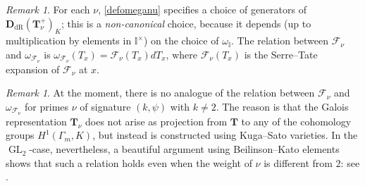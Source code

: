 \documentclass[a4paper,11pt]{amsart}
\numberwithin{equation}{section}
\theoremstyle{plain}
\theoremstyle{definition}
\theoremstyle{remark}
\newtheorem{remark}[theorem]{Remark}
\newcommand{\I}{\mathbb{I}}
\DeclareMathOperator{\GL}{GL}
\begin{document}
\begin{remark} For each $\nu$, \eqref{defomeganu} specifies a choice of generators of 
$\mathbf{D}_\mathrm{dR}(\mathbf{T}_\nu^+)_K$; this is a \emph{non-canonical} choice, because 
it depends (up to multiplication by elements in $\I^\times$) on the choice of $\omega_\I$. 
The relation between $\mathcal{F}_\nu$ and $\omega_{\mathcal{F}_\nu}$ is $\omega_{\mathcal{F}_\nu}(T_x)=\mathcal{F}_\nu(T_x)dT_x$, where $\mathcal{F}_\nu(T_x)$ 
is the Serre--Tate expansion of $\mathcal{F}_\nu$ at $x$.  
\end{remark}

\begin{remark}
At the moment, there is no analogue of the relation between $\mathcal{F}_\nu$ and $\omega_{\mathcal{F}_\nu}$ for primes $\nu$ of signature $(k,\psi)$ with $k\neq 2$. The reason is that the Galois representation $\mathbf{T}_\nu$ does not arise as projection from $\mathbf{T}$ to any of the cohomology groups $H^1(\Gamma_m,K)$, but instead is constructed using Kuga--Sato varieties. In the $\GL_2$-case, nevertheless, a beautiful argument using Beilinson--Kato elements shows that such a relation holds even when the weight of $\nu$ is different from $2$: see \cite[Theorem 10.1]{KLZ.ERL}.
\end{remark}
\end{document}
